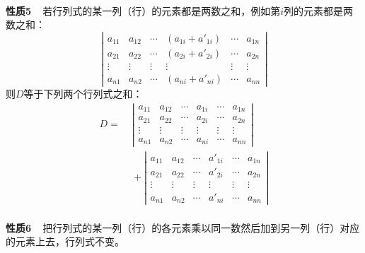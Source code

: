 \paragraph{}
\textbf{性质5~~}若行列式的某一列（行）的元素都是两数之和，例如第$i$列的元素都是两数之和：
\begin{equation*}
\left|\begin{array}{cccccc}
  a_{11} & a_{12} & \cdots & (a_{1i}+a'_{1i}) & \cdots & a_{1n} \\
  a_{21} & a_{22} & \cdots & (a_{2i}+a'_{2i}) & \cdots & a_{2n} \\
  \vdots & \vdots & \vdots & \vdots & \vdots & \vdots \\
  a_{n1} & a_{n2} & \cdots & (a_{ni}+a'_{ni}) & \cdots & a_{n n}
\end{array}\right|
\end{equation*}
则$D$等于下列两个行列式之和：
\begin{align*}
  D =&\; \left|\begin{array}{cccccc}
    a_{11} & a_{12} & \cdots & a_{1i} & \cdots & a_{1n} \\
    a_{21} & a_{22} & \cdots & a_{2i} & \cdots & a_{2n} \\
    \vdots & \vdots & \vdots & \vdots & \vdots & \vdots \\
    a_{n1} & a_{n2} & \cdots & a_{ni} & \cdots & a_{n n}
  \end{array}\right| \\
  &\; + \left|\begin{array}{cccccc}
    a_{11} & a_{12} & \cdots & a'_{1i} & \cdots & a_{1n} \\
    a_{21} & a_{22} & \cdots & a'_{2i} & \cdots & a_{2n} \\
    \vdots & \vdots & \vdots & \vdots & \vdots & \vdots \\
    a_{n1} & a_{n2} & \cdots & a'_{ni} & \cdots & a_{n n}
  \end{array}\right|
\end{align*}

\paragraph{}
\textbf{性质6~~}把行列式的某一列（行）的各元素乘以同一数然后加到另一列（行）对应的元素上去，行列式不变。
